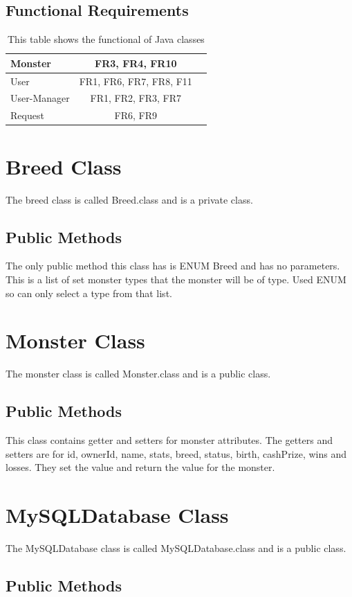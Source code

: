 \documentclass{project}
\begin{document}
\subsection{Functional Requirements}
\begin{table}[!h]
\centering
\begin{tabular}{|l|c|r}
\hline
Monster & FR3, FR4, FR10 \\ \hline
User & FR1, FR6, FR7, FR8, F11 \\ \hline
User-Manager & FR1, FR2, FR3, FR7 \\ \hline
Request & FR6, FR9 \\ \hline
\end{tabular}
\caption{This table shows the functional of Java classes}
\label{tab:myfirsttable}
\end{table} 

\section{Breed Class}
The breed class is called Breed.class and is a private class.
\subsection{Public Methods} 
The only public method this class has is ENUM Breed and has no parameters. This is a list of set monster types that the monster will be of type. Used ENUM so can only select a type from that list.

\section{Monster Class}
The monster class is called Monster.class and is a public class.
\subsection{Public Methods}
This class contains getter and setters for monster attributes. The getters and setters are for id, ownerId, name, stats, breed, status, birth, cashPrize, wins and losses. They set the value and return the value for the monster.

\section{MySQLDatabase Class}
The MySQLDatabase class is called MySQLDatabase.class and is a public class.
\subsection{Public Methods}
\end{document}

